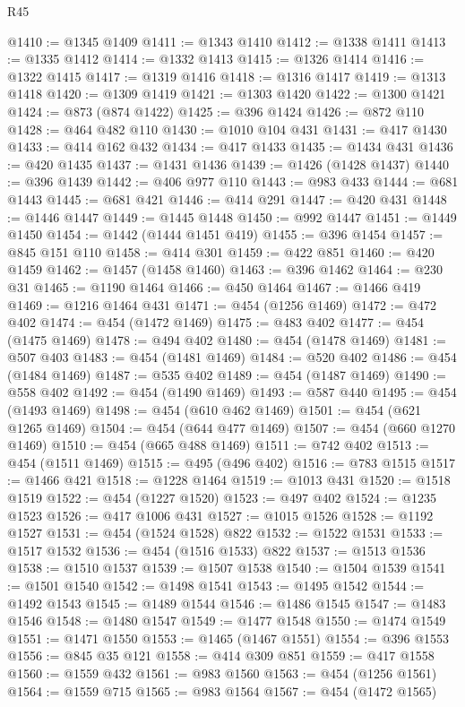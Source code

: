 \begin{lexlean}{R45}
\begin{coremodule}
{{{{{{{{{{{{{{{{{{{{{{{{{{{{{{{{{{{{{{{{{{{{{{{{{{{{{{{{{{{{{{{{{{{{{{{{{{{{{{{{{{{{{{{{{{{@1410 := @1345 @1409
@1411 := @1343 @1410
@1412 := @1338 @1411
@1413 := @1335 @1412
@1414 := @1332 @1413
@1415 := @1326 @1414
@1416 := @1322 @1415
@1417 := @1319 @1416
@1418 := @1316 @1417
@1419 := @1313 @1418
@1420 := @1309 @1419
@1421 := @1303 @1420
@1422 := @1300 @1421
@1424 := @873 (@874 @1422)
@1425 := @396 @1424
@1426 := @872 @110
@1428 := @464 @482 @110
@1430 := @1010 @104 @431
@1431 := @417 @1430
@1433 := @414 @162 @432
@1434 := @417 @1433
@1435 := @1434 @431
@1436 := @420 @1435
@1437 := @1431 @1436
@1439 := @1426 (@1428 @1437)
@1440 := @396 @1439
@1442 := @406 @977 @110
@1443 := @983 @433
@1444 := @681 @1443
@1445 := @681 @421
@1446 := @414 @291
@1447 := @420 @431
@1448 := @1446 @1447
@1449 := @1445 @1448
@1450 := @992 @1447
@1451 := @1449 @1450
@1454 := @1442 (@1444 @1451 @419)
@1455 := @396 @1454
@1457 := @845 @151 @110
@1458 := @414 @301
@1459 := @422 @851
@1460 := @420 @1459
@1462 := @1457 (@1458 @1460)
@1463 := @396 @1462
@1464 := @230 @31
@1465 := @1190 @1464
@1466 := @450 @1464
@1467 := @1466 @419
@1469 := @1216 @1464 @431
@1471 := @454 (@1256 @1469)
@1472 := @472 @402
@1474 := @454 (@1472 @1469)
@1475 := @483 @402
@1477 := @454 (@1475 @1469)
@1478 := @494 @402
@1480 := @454 (@1478 @1469)
@1481 := @507 @403
@1483 := @454 (@1481 @1469)
@1484 := @520 @402
@1486 := @454 (@1484 @1469)
@1487 := @535 @402
@1489 := @454 (@1487 @1469)
@1490 := @558 @402
@1492 := @454 (@1490 @1469)
@1493 := @587 @440
@1495 := @454 (@1493 @1469)
@1498 := @454 (@610 @462 @1469)
@1501 := @454 (@621 @1265 @1469)
@1504 := @454 (@644 @477 @1469)
@1507 := @454 (@660 @1270 @1469)
@1510 := @454 (@665 @488 @1469)
@1511 := @742 @402
@1513 := @454 (@1511 @1469)
@1515 := @495 (@496 @402)
@1516 := @783 @1515
@1517 := @1466 @421
@1518 := @1228 @1464
@1519 := @1013 @431
@1520 := @1518 @1519
@1522 := @454 (@1227 @1520)
@1523 := @497 @402
@1524 := @1235 @1523
@1526 := @417 @1006 @431
@1527 := @1015 @1526
@1528 := @1192 @1527
@1531 := @454 (@1524 @1528) @822
@1532 := @1522 @1531
@1533 := @1517 @1532
@1536 := @454 (@1516 @1533) @822
@1537 := @1513 @1536
@1538 := @1510 @1537
@1539 := @1507 @1538
@1540 := @1504 @1539
@1541 := @1501 @1540
@1542 := @1498 @1541
@1543 := @1495 @1542
@1544 := @1492 @1543
@1545 := @1489 @1544
@1546 := @1486 @1545
@1547 := @1483 @1546
@1548 := @1480 @1547
@1549 := @1477 @1548
@1550 := @1474 @1549
@1551 := @1471 @1550
@1553 := @1465 (@1467 @1551)
@1554 := @396 @1553
@1556 := @845 @35 @121
@1558 := @414 @309 @851
@1559 := @417 @1558
@1560 := @1559 @432
@1561 := @983 @1560
@1563 := @454 (@1256 @1561)
@1564 := @1559 @715
@1565 := @983 @1564
@1567 := @454 (@1472 @1565)
}}}}}}}}}}}}}}}}}}}}}}}}}}}}}}}}}}}}}}}}}}}}}}}}}}}}}}}}}}}}}}}}}}}}}}}}}}}}}}}}}}}}}}}}}}}
\end{coremodule}
\end{lexlean}

